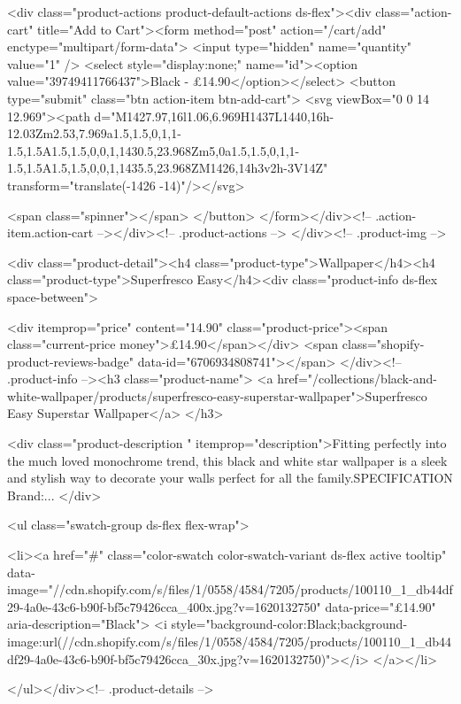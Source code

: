 {{{{{{{<div class="product-actions product-default-actions ds-flex"><div class="action-cart" title="Add to Cart"><form method="post" action="/cart/add" enctype="multipart/form-data">
            <input type="hidden" name="quantity" value="1" />
            <select style="display:none;" name="id"><option value="39749411766437">Black - £14.90</option></select>
            <button type="submit" class="btn action-item btn-add-cart">
              <svg viewBox="0 0 14 12.969"><path d="M1427.97,16l1.06,6.969H1437L1440,16h-12.03Zm2.53,7.969a1.5,1.5,0,1,1-1.5,1.5A1.5,1.5,0,0,1,1430.5,23.968Zm5,0a1.5,1.5,0,1,1-1.5,1.5A1.5,1.5,0,0,1,1435.5,23.968ZM1426,14h3v2h-3V14Z" transform="translate(-1426 -14)"/></svg>

              <span class="spinner"></span>
            </button>
          </form></div><!-- .action-item.action-cart --></div><!-- .product-actions -->
</div><!-- .product-img -->

<div class="product-detail"><h4 class="product-type">Wallpaper</h4><h4 class="product-type">Superfresco Easy</h4><div class="product-info ds-flex space-between">
    
<div itemprop="price" content="14.90" class="product-price"><span class="current-price money">£14.90</span></div>
    <span class="shopify-product-reviews-badge" data-id="6706934808741"></span>
  </div><!-- .product-info --><h3 class="product-name">
      <a href="/collections/black-and-white-wallpaper/products/superfresco-easy-superstar-wallpaper">Superfresco Easy Superstar Wallpaper</a>
    </h3>
    
<div class="product-description " itemprop="description">Fitting perfectly into the much loved monochrome trend, this black and white star wallpaper is a sleek and stylish way to decorate your walls perfect for all the family.SPECIFICATION Brand:...
</div>



<ul class="swatch-group ds-flex flex-wrap">
        
<li><a href="#" class="color-swatch color-swatch-variant ds-flex active tooltip" data-image="//cdn.shopify.com/s/files/1/0558/4584/7205/products/100110_1_db44df29-4a0e-43c6-b90f-bf5c79426cca_400x.jpg?v=1620132750" data-price="£14.90" aria-description="Black">
              <i style="background-color:Black;background-image:url(//cdn.shopify.com/s/files/1/0558/4584/7205/products/100110_1_db44df29-4a0e-43c6-b90f-bf5c79426cca_30x.jpg?v=1620132750)"></i>
            </a></li>

      </ul></div><!-- .product-details -->

}}}}}}}
